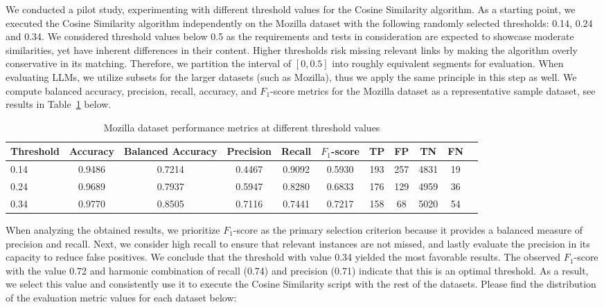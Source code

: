 \documentclass[conference]{IEEEtran}
\begin{document}
\newpage %

We conducted a pilot study, experimenting with different threshold values for the Cosine Similarity algorithm. As a starting point, we executed the Cosine Similarity algorithm independently on the Mozilla dataset with the following randomly selected thresholds: 0.14, 0.24 and 0.34. We considered threshold values below 0.5 as the requirements and tests in consideration are expected to showcase moderate similarities, yet have inherent differences in their content. Higher thresholds risk missing relevant links by making the algorithm overly conservative in its matching. Therefore, we partition the interval of $[0, 0.5]$ into roughly equivalent segments for evaluation. When evaluating LLMs, we utilize subsets for the larger datasets (such as Mozilla), thus we apply the same principle in this step as well. We compute balanced accuracy, precision, recall, accuracy, and $F_1$-score metrics for the Mozilla dataset as a representative sample dataset, see results in Table~\ref{tab:performance_metrics} below.

\begin{table}[h!]
\centering
\caption{Mozilla dataset performance metrics at different threshold values}
\begin{tabular}{lcccccccccc}
    \toprule
    Threshold & Accuracy & Balanced Accuracy & Precision & Recall & $F_1$-score & TP & FP & TN & FN \\
    \midrule
    0.14 & 0.9486 & 0.7214 & 0.4467 & 0.9092 & 0.5930 & 193 & 257 & 4831 & 19  \\
    0.24 & 0.9689 & 0.7937 & 0.5947 & 0.8280 & 0.6833 & 176 & 129 & 4959 & 36  \\
    0.34 & 0.9770 & 0.8505 & 0.7116 & 0.7441 & 0.7217 & 158 & 68  & 5020 & 54  \\
    \bottomrule
\end{tabular}
\label{tab:performance_metrics}
\end{table}

When analyzing the obtained results, we prioritize $F_1$-score as the primary selection criterion because it provides a balanced measure of precision and recall. Next, we consider high recall to ensure that relevant instances are not missed, and lastly evaluate the precision in its capacity to reduce false positives. We conclude that the threshold with value 0.34 yielded the most favorable results. The observed $F_1$-score with the value 0.72 and harmonic combination of recall (0.74) and precision (0.71) indicate that this is an optimal threshold. As a result, we select this value and consistently use it to execute the Cosine Similarity script with the rest of the datasets. 
Please find the distribution of the evaluation metric values for each dataset below:
\end{document}
